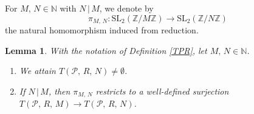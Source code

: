 \documentclass[reqno,11pt]{article}
\theoremstyle{plain} %
\newtheorem{lemma}[theorem]{\indent\sc Lemma}
\theoremstyle{definition} %
\begin{document}
For $M,\,N\in\mathbb{N}$ with $N\,|\,M$, we denote by
\begin{equation*}
\pi_{M,\,N}:\mathrm{SL}_2(\mathbb{Z}/M\mathbb{Z})
\rightarrow\mathrm{SL}_2(\mathbb{Z}/N\mathbb{Z})
\end{equation*}
the natural homomorphism induced from reduction. 

\begin{lemma}\label{TLemma}
With the notation of \textup{Definition \ref{TPR}}, let $M,\,N\in\mathbb{N}$.
\begin{enumerate}
\item[\textup{(i)}] We attain $T(\mathcal{P},\,R,\,N)\neq\emptyset$. 
\item[\textup{(ii)}] If $N\,|\,M$, then $\pi_{M,\,N}$ restricts to 
a well-defined surjection
$T(\mathcal{P},\,R,\,M)\rightarrow
T(\mathcal{P},\,R,\,N)$. 
\end{enumerate}
\end{lemma}
\end{document}
